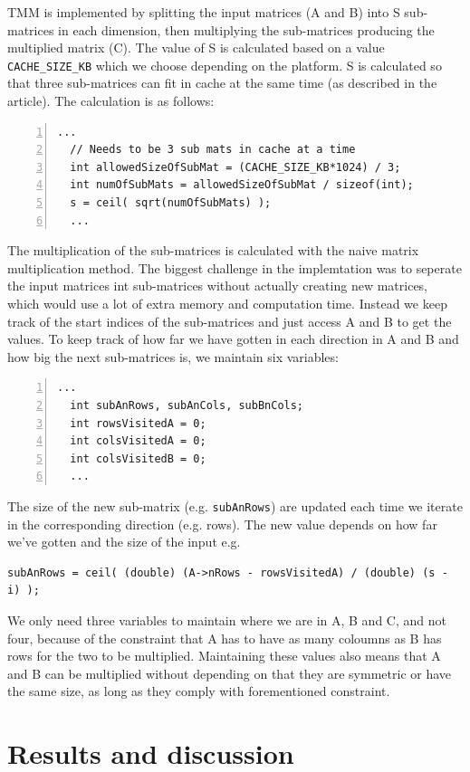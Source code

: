 TMM is implemented by splitting the input matrices (A and B) into S sub-matrices in each dimension, then multiplying the sub-matrices producing the multiplied matrix (C). 
The value of S is calculated based on a value \verb!CACHE_SIZE_KB! which we choose depending on the platform. S is calculated so that three sub-matrices can fit in cache at the same time (as described in the article).
The calculation is as follows:
\begin{lstlisting}[numbers=left]
  ...
  // Needs to be 3 sub mats in cache at a time
  int allowedSizeOfSubMat = (CACHE_SIZE_KB*1024) / 3;
  int numOfSubMats = allowedSizeOfSubMat / sizeof(int);
  s = ceil( sqrt(numOfSubMats) );
  ... 
\end{lstlisting}
The multiplication of the sub-matrices is calculated with the naive matrix multiplication method. 
The biggest challenge in the implemtation was to seperate the input matrices int sub-matrices without actually creating new matrices, which would use a lot of extra memory and computation time. 
Instead we keep track of the start indices of the sub-matrices and just access A and B to get the values. 
To keep track of how far we have gotten in each direction in A and B and how big the next sub-matrices is, we maintain six variables:
\begin{lstlisting}[numbers=left]
  ...
  int subAnRows, subAnCols, subBnCols;
  int rowsVisitedA = 0;
  int colsVisitedA = 0;
  int colsVisitedB = 0;
  ...
\end{lstlisting}
The size of the new sub-matrix (e.g. \verb!subAnRows!) are updated each time we iterate in the corresponding direction (e.g. rows). 
The new value depends on how far we've gotten and the size of the input e.g.
\begin{lstlisting}
subAnRows = ceil( (double) (A->nRows - rowsVisitedA) / (double) (s - i) );
\end{lstlisting}

We only need three variables to maintain where we are in A, B and C, and not four, because of the constraint that A has to have as many coloumns as B has rows for the two to be multiplied. 
Maintaining these values also means that A and B can be multiplied without depending on that they are symmetric or have the same size, as long as they comply with forementioned constraint.



\section{Results and discussion}



